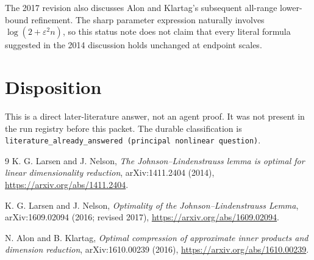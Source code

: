 \documentclass[11pt]{article}
\begin{document}
The 2017 revision also discusses Alon and Klartag's subsequent
all-range lower-bound refinement.  The sharp parameter expression naturally
involves $\log(2+\varepsilon^2n)$, so this status note does not claim that every
literal formula suggested in the 2014 discussion holds unchanged at endpoint
scales.

\section{Disposition}

This is a direct later-literature answer, not an agent proof.  It was not
present in the run registry before this packet.  The durable classification is
\texttt{literature\_already\_answered (principal nonlinear question)}.

\begin{thebibliography}{9}
K. G. Larsen and J. Nelson,
\emph{The Johnson--Lindenstrauss lemma is optimal for linear dimensionality
reduction}, arXiv:1411.2404 (2014),
\url{https://arxiv.org/abs/1411.2404}.

K. G. Larsen and J. Nelson,
\emph{Optimality of the Johnson--Lindenstrauss Lemma},
arXiv:1609.02094 (2016; revised 2017),
\url{https://arxiv.org/abs/1609.02094}.

N. Alon and B. Klartag,
\emph{Optimal compression of approximate inner products and dimension
reduction}, arXiv:1610.00239 (2016),
\url{https://arxiv.org/abs/1610.00239}.
\end{thebibliography}
\end{document}
